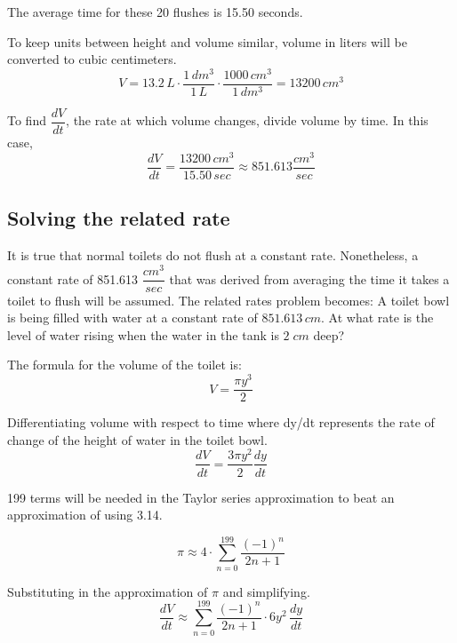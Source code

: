 \documentclass[12pt, titlepage]{article}
\begin{document}
The average time for these 20 flushes is 15.50 seconds. 

To keep units between height and volume similar, volume in liters will be converted to cubic centimeters.
\begin{equation*}
  V = 13.2 \, L \cdot \frac{1 \, dm^{3}}{1 \,L} \cdot \frac{1000 \,cm^{3}}{1 \,dm^{3}} = 13200 \,cm^{3} 
\end{equation*}

To find \(\dfrac{dV}{dt}\), the rate at which volume changes, divide volume by time. In this case,
\begin{equation*}
  \dfrac{dV}{dt} = \dfrac{13200 \,cm^{3}}{15.50 \,sec} \approx 851.613 \dfrac{cm^{3}}{sec}
\end{equation*}

\subsection{Solving the related rate}
It is true that normal toilets do not flush at a constant rate. Nonetheless,  a constant rate of 851.613 \(\dfrac{cm^{3}}{sec}\) that was derived from averaging the time it takes a toilet to flush will be assumed. The related rates problem becomes: A toilet bowl is being filled with water at a constant rate of \(851.613 \, cm\). At what rate is the level of water rising when the water in the tank is \(2 \; cm\) deep?

The formula for the volume of the toilet is:
\begin{equation*}
    V = \frac{\pi y^3}{2}
\end{equation*}

Differentiating volume with respect to time where dy/dt represents the rate of change of the height of water in the toilet bowl.
\begin{equation*}
  \frac{dV}{dt} = \frac{3 \pi y^2}{2} \frac{dy}{dt}
\end{equation*}

199 terms will be needed in the Taylor series approximation to beat an approximation of using 3.14.

\begin{equation*}
  \pi \approx 4 \cdot \sum_{n=0}^{199}{\frac{(-1)^n}{2n+1}}
\end{equation*}

Substituting in the approximation of \(\pi\) and simplifying.
\begin{equation*}
  \frac{dV}{dt} \approx \sum_{n=0}^{199}{\frac{(-1)^n}{2n+1}}  \cdot 6y^{2} \,\frac{dy}{dt}
\end{equation*}
\end{document}
